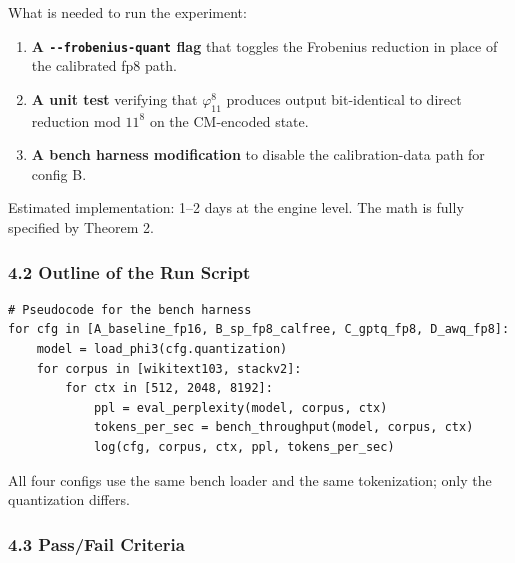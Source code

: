 \documentclass[
  11pt,
]{article}
\providecommand{\tightlist}{%
  \setlength{\itemsep}{0pt}\setlength{\parskip}{0pt}}
\begin{document}
What is needed to run the experiment:

\begin{enumerate}
\def\labelenumi{\arabic{enumi}.}
\tightlist
\item
  \textbf{A \texttt{-\/-frobenius-quant} flag} that toggles the
  Frobenius reduction in place of the calibrated fp8 path.
\item
  \textbf{A unit test} verifying that \(\varphi_{11}^8\) produces output
  bit-identical to direct reduction mod \(11^8\) on the CM-encoded
  state.
\item
  \textbf{A bench harness modification} to disable the calibration-data
  path for config B.
\end{enumerate}

Estimated implementation: 1--2 days at the engine level. The math is
fully specified by Theorem 2.

\hypertarget{outline-of-the-run-script}{%
\subsubsection{4.2 Outline of the Run
Script}\label{outline-of-the-run-script}}

\begin{verbatim}
# Pseudocode for the bench harness
for cfg in [A_baseline_fp16, B_sp_fp8_calfree, C_gptq_fp8, D_awq_fp8]:
    model = load_phi3(cfg.quantization)
    for corpus in [wikitext103, stackv2]:
        for ctx in [512, 2048, 8192]:
            ppl = eval_perplexity(model, corpus, ctx)
            tokens_per_sec = bench_throughput(model, corpus, ctx)
            log(cfg, corpus, ctx, ppl, tokens_per_sec)
\end{verbatim}

All four configs use the same bench loader and the same tokenization;
only the quantization differs.

\hypertarget{passfail-criteria}{%
\subsubsection{4.3 Pass/Fail Criteria}\label{passfail-criteria}}
\end{document}
